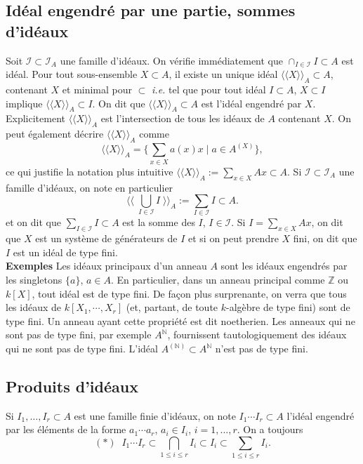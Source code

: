 \documentclass[a4paper, oneside, 12pt]{book}
\theoremstyle{theoremeStyle} %
\theoremstyle{definition} %
\newcommand{\ie}{\textit{i.e.}} %
\newcommand{\Z}{\mathbb{Z}}
\newcommand{\N}{\mathbb{N}}
\begin{document}
\subsection{Idéal engendré par une partie, sommes d'idéaux}Soit $\mathcal{I}\subset \mathcal{I}_A$ une famille d'idéaux. On vérifie immédiatement que $\cap_{I\in \mathcal{I}}I\subset A$ est idéal. Pour tout sous-ensemble $X\subset A$, il existe
un unique idéal $\langle\langle X\rangle\rangle_A \subset A$, contenant $X$ et minimal pour $\subset$ \ie{} tel que pour  tout idéal $I\subset A$,   $X\subset I$ implique  $\langle\langle X\rangle\rangle_A\subset I$. On dit que $\langle\langle X\rangle\rangle_A\subset A$ est l'idéal engendré par $X$. Explicitement $\langle\langle X\rangle\rangle_A$ est l'intersection de tous les idéaux de $A$ contenant $X$. On peut également décrire $\langle\langle X\rangle\rangle_A$ comme
$$\langle\langle X\rangle\rangle_A=\lbrace \sum_{x\in X}a(x)x\;|\; a \in A^{(X)}\rbrace,$$
ce qui justifie la notation plus intuitive $\langle\langle X\rangle\rangle_A:=\sum_{x\in X}Ax\subset A$. Si  $\mathcal{I}\subset \mathcal{I}_A$ une famille d'idéaux, on note en particulier $$ \langle\langle\; \bigcup_{I\in \mathcal{I}}I\;  \rangle\rangle_A :=\sum_{I\in \mathcal{I}}I\subset A.$$ et on dit que $\sum_{I\in \mathcal{I}}I\subset A$ est la somme des $I$, $I\in \mathcal{I}$. Si  $I=\sum_{x\in X} Ax$, on dit que $X$ est un système de générateurs de $I$ et si on peut prendre $X$ fini, on dit que $I$ est un idéal de type fini.\\

\textbf{Exemples}  Les idéaux principaux d'un anneau $A$ sont les idéaux engendrés par les singletons $\lbrace a\rbrace$, $a\in A$. En particulier, dans un anneau principal comme $\Z$ ou $k[X]$, tout idéal est de type fini.  De fa\c{c}on plus surprenante, on verra que tous les idéaux de $k[X_1,\cdots, X_r]$ (et, partant, de toute $k$-algèbre de type fini) sont de type fini. Un anneau ayant cette propriété est dit noetherien. Les anneaux qui ne sont pas de type fini, par exemple $A^\N$, fournissent tautologiquement des idéaux qui ne sont pas de type fini. L'idéal $A^{(\N)}\subset A^\N$ n'est pas de type fini.\\


\subsection{Produits d'idéaux}Si $I_1,\dots, I_r\subset A$ est une famille finie d'idéaux, on note $I_1\cdots I_r\subset A$ l'idéal engendré par les éléments de la forme $a_1\cdots a_r$, $a_i\in I_i$, $i=1,\dots, r$. On a toujours $$(*)\;\; I_1\cdots I_r\subset \displaystyle{\bigcap_{1\leq i\leq r}I_i}\subset I_i\subset \sum_{1\leq i\leq r} I_i.$$
\end{document}

